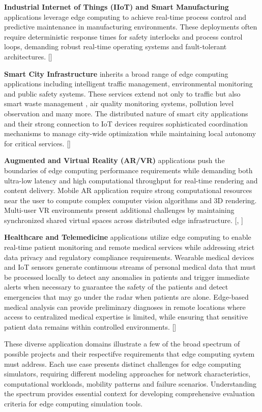 \textbf{Industrial Internet of Things (IIoT) and Smart Manufacturing} applications leverage edge computing to achieve real-time process control and predictive maintenance in manufacturing environments.
These deployments often require deterministic response times for safety interlocks and process control loops, demanding robust real-time operating systems and fault-tolerant architectures. [\cite{SAVAGLIO2024397}]

\textbf{Smart City Infrastructure} inherits a broad range of edge computing applications including intelligent traffic management, environmental monitoring and public safety systems.
These services extend not only to traffic but also smart waste management , air quality monitoring systems, pollution level observation and many more.
The distributed nature of smart city applications and their strong connection to IoT devices requires sophisticated coordination mechanisms to manage city-wide optimization while maintaining local autonomy for critical services. [\cite{JARARWEH2020102394}]

\textbf{Augmented and Virtual Reality (AR/VR)} applications push the boundaries of edge computing performance requirements while demanding both ultra-low latency and high computational throughput for real-time rendering and content delivery.
Mobile AR application require strong computational resources near the user to compute complex computer vision algorithms and 3D rendering. Multi-user VR environments present additional challenges by maintaining synchronized shared virtual spaces across distributed edge infrastructure. [\cite{herabad2024optimizingserviceplacementedgetocloud}, \cite{11020287}]

\textbf{Healthcare and Telemedicine} applications utilize edge computing to enable real-time patient monitoring and remote medical services while addressing strict data privacy and regulatory compliance requirements.
Wearable medical devices and IoT sensors generate continuous streams of personal medical data that must be processed locally to detect any anomalies in patients and trigger immediate alerts when necessary to guarantee the safety of the patients and detect emergencies that may go under the radar when patients are alone.
Edge-based medical analysis can provide preliminary diagnoses in remote locations where access to centralized medical expertise is limited, while ensuring that sensitive patient data remains within controlled environments. [\cite{9767142}]

These diverse application domains illustrate a few of the broad spectrum of possible projects and their respectifve requirements that edge computing system must address.
Each use case presents distinct challenges for edge computing simulators, requiring different modeling approaches for network characteristics, computational workloads, mobility patterns and failure scenarios.
Understanding the spectrum provides essential context for developing comprehensive evaluation criteria for edge computing simulation tools.

